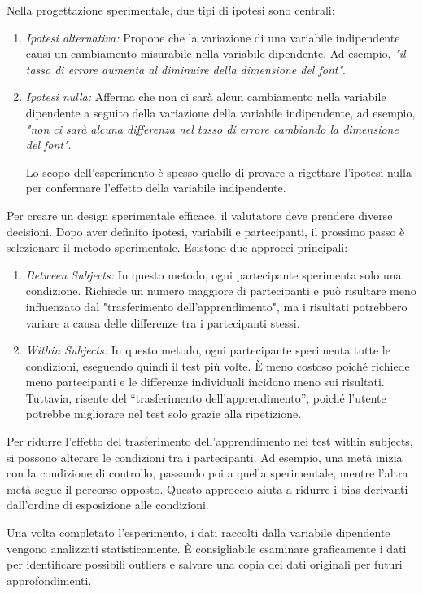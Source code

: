 Nella progettazione sperimentale, due tipi di ipotesi sono centrali:
\begin{enumerate}
    \item \textit{Ipotesi alternativa:} Propone che la variazione di una variabile indipendente causi un cambiamento misurabile nella variabile dipendente. Ad esempio, \textit{"il tasso di errore aumenta al diminuire della dimensione del font"}.
    \item \textit{Ipotesi nulla:} Afferma che non ci sarà alcun cambiamento nella variabile dipendente a seguito della variazione della variabile indipendente, ad esempio, \textit{"non ci sarà alcuna differenza nel tasso di errore cambiando la dimensione del font"}. 
    
    Lo scopo dell'esperimento è spesso quello di provare a rigettare l'ipotesi nulla per confermare l’effetto della variabile indipendente.
\end{enumerate}
Per creare un design sperimentale efficace, il valutatore deve prendere diverse decisioni. Dopo aver definito ipotesi, variabili e partecipanti, il prossimo passo è selezionare il metodo sperimentale. Esistono due approcci principali:
\begin{enumerate}
    \item \textit{Between Subjects:} In questo metodo, ogni partecipante sperimenta solo una condizione. Richiede un numero maggiore di partecipanti e può risultare meno influenzato dal "trasferimento dell’apprendimento", ma i risultati potrebbero variare a causa delle differenze tra i partecipanti stessi.
    \item \textit{Within Subjects:} In questo metodo, ogni partecipante sperimenta tutte le condizioni, eseguendo quindi il test più volte. È meno costoso poiché richiede meno partecipanti e le differenze individuali incidono meno sui risultati. Tuttavia, risente del “trasferimento dell’apprendimento”, poiché l’utente potrebbe migliorare nel test solo grazie alla ripetizione.
\end{enumerate}
Per ridurre l'effetto del trasferimento dell’apprendimento nei test within subjects, si possono alterare le condizioni tra i partecipanti. Ad esempio, una metà inizia con la condizione di controllo, passando poi a quella sperimentale, mentre l'altra metà segue il percorso opposto. Questo approccio aiuta a ridurre i bias derivanti dall'ordine di esposizione alle condizioni.

Una volta completato l'esperimento, i dati raccolti dalla variabile dipendente vengono analizzati statisticamente. È consigliabile esaminare graficamente i dati per identificare possibili outliers e salvare una copia dei dati originali per futuri approfondimenti.

